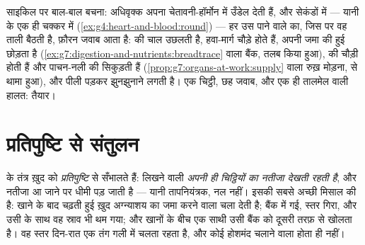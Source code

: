 \begin{example}[एक संदेशवाहक का दौरा: चेतावनी-हॉर्मोन]\label{ex:g8:hormonal-communication:alarm}
साइकिल पर बाल-बाल बचना: अधिवृक्क  अपना चेतावनी-हॉर्मोन  में
उँडेल देती हैं, और सेकंडों में --- यानी  के एक ही चक्कर में
(\cref{ex:g4:heart-and-blood:round}) --- हर उस पाने वाले का, जिस पर वह
ताली बैठती है, फ़ौरन जवाब आता है:  की चाल उछलती है, हवा-मार्ग चौड़े
होते हैं,  अपनी जमा की हुई  छोड़ता है
(\cref{ex:g7:digestion-and-nutrients:breadtrace} वाला बैंक, तलब किया
हुआ),  की  चौड़ी होती हैं और पाचन-नली की सिकुड़ती हैं
(\cref{prop:g7:organs-at-work:supply} वाला रुख़ मोड़ना,  से थामा
हुआ), और  पीली पड़कर झुनझुनाने लगती है। एक चिट्ठी, छह जवाब, और एक
ही तालमेल वाली हालत: तैयार।
\end{example}

\section{प्रतिपुष्टि से संतुलन}

\begin{proposition}[प्रतिपुष्टि का उसूल]\label{prop:g8:hormonal-communication:feedback}
 के तंत्र ख़ुद को \emph{प्रतिपुष्टि} से सँभालते
हैं: लिखने वाली  \emph{अपनी ही चिट्ठियों का नतीजा देखती रहती है},
और नतीजा आ जाने पर धीमी पड़ जाती है --- यानी तापनियंत्रक, नल नहीं। इसकी
सबसे अच्छी मिसाल  की  है: खाने के बाद चढ़ती हुई 
ख़ुद अग्न्याशय का जमा करने वाला  चला देती है;  बैंक में
गई, स्तर गिरा, और उसी के साथ वह स्राव भी थम गया; और खानों के बीच एक
साथी  उसी बैंक को दूसरी तरफ़ से खोलता है। वह स्तर दिन-रात एक तंग
गली में चलता रहता है, और कोई होशमंद चलाने वाला होता ही नहीं।
\end{proposition}
\admitted

